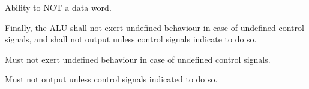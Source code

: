 \begin{feat-requirement}
  Ability to NOT a data word.
\end{feat-requirement}

Finally, the ALU shall not exert undefined behaviour in case of undefined control signals, and shall not output unless control signals indicate to do so. 

\begin{feat-requirement}
  Must not exert undefined behaviour in case of undefined control signals. 
\end{feat-requirement}

\begin{feat-requirement}
  Must not output unless control signals indicated to do so. 
\end{feat-requirement}

